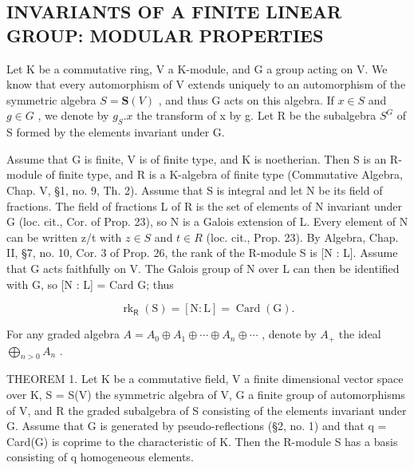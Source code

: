 \subsection{INVARIANTS OF A FINITE LINEAR GROUP: MODULAR PROPERTIES}

Let K be a commutative ring, V a K-module, and G a group acting on V. We know that every automorphism of V extends uniquely to an automorphism of the symmetric algebra \(S = \mathbf{S}(V)\) , and thus G acts on this algebra. If \(x \in S\) and \(g \in G\) , we denote by \(g_{S}.x\) the transform of x by g. Let R be the subalgebra \(S^{G}\) of S formed by the elements invariant under G.

Assume that G is finite, V is of finite type, and K is noetherian. Then S is an R-module of finite type, and R is a K-algebra of finite type (Commutative Algebra, Chap. V, §1, no. 9, Th. 2). Assume that S is integral and let N be its field of fractions. The field of fractions L of R is the set of elements of N invariant under G (loc. cit., Cor. of Prop. 23), so N is a Galois extension of L. Every element of N can be written z/t with \(z \in S\) and \(t \in R\) (loc. cit., Prop. 23). By Algebra, Chap. II, §7, no. 10, Cor. 3 of Prop. 26, the rank of the R-module S is {[}N : L{]}. Assume that G acts faithfully on V. The Galois group of N over L can then be identified with G, so {[}N : L{]} = Card G; thus

\[
\operatorname{rk} _ {\mathsf {R}} (\mathrm{S}) = [ \mathrm{N}: \mathrm{L} ] = \operatorname{Card} (\mathrm{G}).\tag{6}
\]

For any graded algebra \(A = A_{0} \oplus A_{1} \oplus \cdots \oplus A_{n} \oplus \cdots\) , denote by \(A_{+}\) the ideal \(\bigoplus_{n > 0} A_{n}\) .

THEOREM 1. Let K be a commutative field, V a finite dimensional vector space over K, S = S(V) the symmetric algebra of V, G a finite group of automorphisms of V, and R the graded subalgebra of S consisting of the elements invariant under G. Assume that G is generated by pseudo-reflections (§2, no. 1) and that q = Card(G) is coprime to the characteristic of K. Then the R-module S has a basis consisting of q homogeneous elements.

